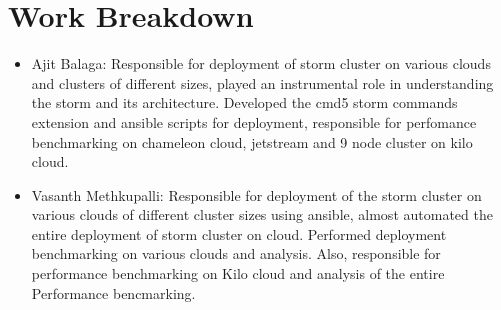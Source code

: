 \documentclass[9pt,twocolumn,twoside]{../../styles/osajnl}
\begin{document}

\clearpage
\appendix

\section{Work Breakdown}
\begin{itemize}
\item Ajit Balaga: Responsible for deployment of storm cluster on
  various clouds and clusters of different sizes, played an
  instrumental role in understanding the storm and its
  architecture. Developed the cmd5 storm commands extension and
  ansible scripts for deployment, responsible for perfomance
  benchmarking on chameleon cloud, jetstream and 9 node cluster on
  kilo cloud.
\item Vasanth Methkupalli: Responsible for deployment of the storm
  cluster on various clouds of different cluster sizes using ansible,
  almost automated the entire deployment of storm cluster on
  cloud. Performed deployment benchmarking on various clouds and
  analysis. Also, responsible for performance benchmarking on Kilo
  cloud and analysis of the entire Performance bencmarking.
\end{itemize}

\listoffigures
\listoftables
\end{document}
